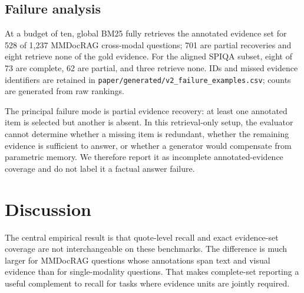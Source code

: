\documentclass[11pt]{article}
\begin{document}
\begin{table}[t]
\centering
\caption{Complete evidence coverage, quote recall, and example-level evidence F1 at each budget for all tested policies.}
\label{tab:systems}
\scriptsize

\end{table}

\begin{table}[t]
\centering
\caption{Paired cross-modal complete-coverage differences versus global BM25. Intervals and p-values are generated from the same per-question raw outputs; Holm adjustment is within each benchmark.}
\label{tab:policy-tests}
\scriptsize

\end{table}

\subsection{Failure analysis}
At a budget of ten, global BM25 fully retrieves the annotated evidence set for 528 of 1,237 MMDocRAG cross-modal questions; 701 are partial recoveries and eight retrieve none of the gold evidence. For the aligned SPIQA subset, eight of 73 are complete, 62 are partial, and three retrieve none. IDs and missed evidence identifiers are retained in \texttt{paper/generated/v2\_failure\_examples.csv}; counts are generated from raw rankings.

\begin{table}[t]
\centering
\caption{Cross-modal global-BM25 failures at a budget of ten.}
\label{tab:failures}

\end{table}

The principal failure mode is partial evidence recovery: at least one annotated item is selected but another is absent. In this retrieval-only setup, the evaluator cannot determine whether a missing item is redundant, whether the remaining evidence is sufficient to answer, or whether a generator would compensate from parametric memory. We therefore report it as incomplete annotated-evidence coverage and do not label it a factual answer failure.

\section{Discussion}
The central empirical result is that quote-level recall and exact evidence-set coverage are not interchangeable on these benchmarks. The difference is much larger for MMDocRAG questions whose annotations span text and visual evidence than for single-modality questions. That makes complete-set reporting a useful complement to recall for tasks where evidence units are jointly required.
\end{document}
